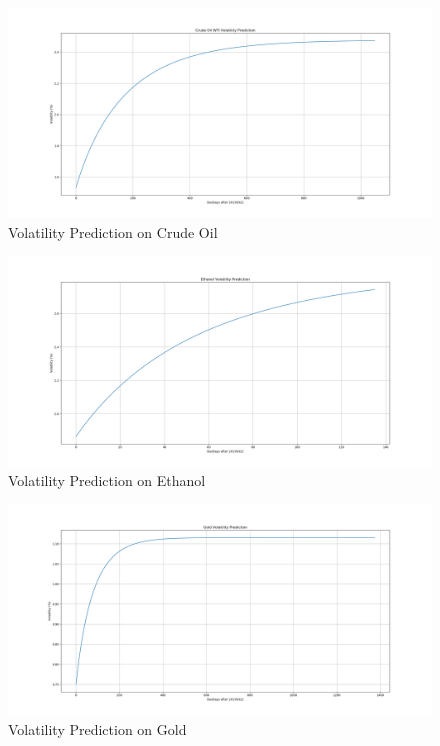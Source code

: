 \documentclass[10pt, a4paper, twocolumn]{article} %
\begin{document}
\begin{figure}[!ht]
	\includegraphics[width=\linewidth]{CrudeOilvol.png} %
	\caption{Volatility Prediction on Crude Oil} %
	\label{oil pred} %
\end{figure}

\begin{figure}[!ht]
	\includegraphics[width=\linewidth]{Ethanolvol.png} %
	\caption{Volatility Prediction on Ethanol} %
	\label{eth pred} %
\end{figure}

\begin{figure}[!ht]
	\includegraphics[width=\linewidth]{Goldvol.png} %
	\caption{Volatility Prediction on Gold} %
	\label{gold pred} %
\end{figure}
\end{document}
